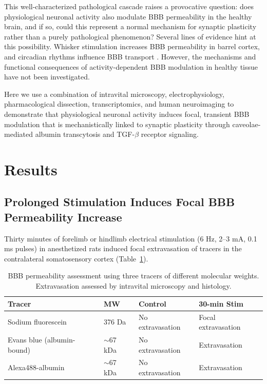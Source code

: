 \documentclass[11pt]{article}
\begin{document}
This well-characterized pathological cascade raises a provocative question: does physiological neuronal activity also modulate BBB permeability in the healthy brain, and if so, could this represent a normal mechanism for synaptic plasticity rather than a purely pathological phenomenon? Several lines of evidence hint at this possibility. Whisker stimulation increases BBB permeability in barrel cortex, and circadian rhythms influence BBB transport \citep{iadecola2017neurovascular}. However, the mechanisms and functional consequences of activity-dependent BBB modulation in healthy tissue have not been investigated.

Here we use a combination of intravital microscopy, electrophysiology, pharmacological dissection, transcriptomics, and human neuroimaging to demonstrate that physiological neuronal activity induces focal, transient BBB modulation that is mechanistically linked to synaptic plasticity through caveolae-mediated albumin transcytosis and TGF-$\beta$ receptor signaling.

\section{Results}

\subsection{Prolonged Stimulation Induces Focal BBB Permeability Increase}

Thirty minutes of forelimb or hindlimb electrical stimulation (6 Hz, 2--3 mA, 0.1 ms pulses) in anesthetized rats induced focal extravasation of tracers in the contralateral somatosensory cortex (Table~\ref{tab:tracers}).

\begin{table}[H]
\centering
\caption{BBB permeability assessment using three tracers of different molecular weights. Extravasation assessed by intravital microscopy and histology.}
\label{tab:tracers}
\begin{tabular}{llll}
\toprule
\textbf{Tracer} & \textbf{MW} & \textbf{Control} & \textbf{30-min Stim} \\
\midrule
Sodium fluorescein & 376 Da & No extravasation & Focal extravasation \\
Evans blue (albumin-bound) & $\sim$67 kDa & No extravasation & Extravasation \\
Alexa488-albumin & $\sim$67 kDa & No extravasation & Extravasation \\
\bottomrule
\end{tabular}
\end{table}
\end{document}

